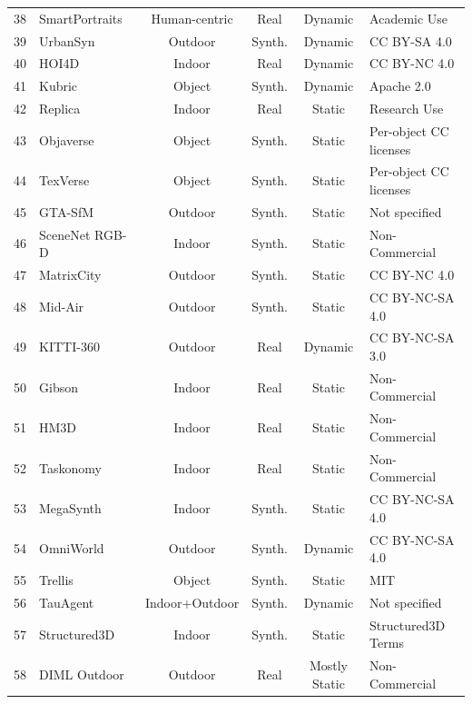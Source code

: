 \documentclass{llmxive}
\begin{document}
\begin{table}[h]
\begin{tabularx}{\textwidth}{@{}c >{\centering\arraybackslash}X c c c >{\centering\arraybackslash}X@{}}
38 & SmartPortraits~\cite{kornilova2022smartportraits} & Human-centric & Real & Dynamic & Academic Use \\
39 & UrbanSyn~\cite{gomez2025urbansyn} & Outdoor & Synth. & Dynamic & CC BY-SA 4.0 \\
40 & HOI4D~\cite{liu2022hoi4d} & Indoor & Real & Dynamic & CC BY-NC 4.0 \\
41 & Kubric~\cite{greff2022kubric} & Object & Synth. & Dynamic & Apache 2.0 \\
42 & Replica~\cite{straub2019replica} & Indoor & Real & Static & Research Use \\
43 & Objaverse~\cite{deitke2023objaverse} & Object & Synth. & Static & Per-object CC licenses \\
44 & TexVerse~\cite{zhang2025texverse} & Object & Synth. & Static & Per-object CC licenses \\
45 & GTA-SfM~\cite{wang2020flow} & Outdoor & Synth. & Static & Not specified \\
46 & SceneNet RGB-D~\cite{mccormac2016scenenet} & Indoor & Synth. & Static & Non-Commercial \\
47 & MatrixCity~\cite{li2023matrixcity} & Outdoor & Synth. & Static & CC BY-NC 4.0 \\
48 & Mid-Air~\cite{fonder2019midair} & Outdoor & Synth. & Static & CC BY-NC-SA 4.0 \\
49 & KITTI-360~\cite{liao2021kitti360} & Outdoor & Real & Dynamic & CC BY-NC-SA 3.0 \\
50 & Gibson~\cite{xia2018gibson} & Indoor & Real & Static & Non-Commercial \\
51 & HM3D~\cite{ramakrishnan2021hm3d} & Indoor & Real & Static & Non-Commercial \\
52 & Taskonomy~\cite{zamir2018taskonomy} & Indoor & Real & Static & Non-Commercial \\
53 & MegaSynth~\cite{jiang2025megasynth} & Indoor & Synth. & Static & CC BY-NC-SA 4.0 \\
54 & OmniWorld~\cite{zhou2025omniworld} & Outdoor & Synth. & Dynamic & CC BY-NC-SA 4.0 \\
55 & Trellis~\cite{xiang2025structured} & Object & Synth. & Static & MIT \\
56 & TauAgent~\cite{gil2021online} & Indoor+Outdoor & Synth. & Dynamic & Not specified \\
57 & Structured3D~\cite{zheng2020structured3d} & Indoor & Synth. & Static & Structured3D Terms \\
58 & DIML Outdoor~\cite{cho2021diml} & Outdoor & Real & Mostly Static & Non-Commercial \\

\end{tabularx}
\end{table}
\end{document}
